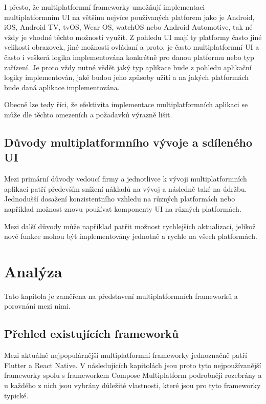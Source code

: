 I přesto, že multiplatformní frameworky umožňují implementaci multiplatformním UI na většinu nejvíce používaných platforem jako je Android, iOS,
Android TV, tvOS, Wear OS, watchOS nebo Android Automotive, tak né vždy je vhodné těchto možností využít. Z pohledu UI mají ty platformy často jiné 
velikosti obrazovek, jiné možnosti ovládaní a proto, je často multiplatformní UI a často i veškerá logika implementována konkrétně pro danou platformu
nebo typ zařízení. Je proto vždy nutné vědět jaký typ aplikace bude z pohledu aplikační logiky implementován, jaké budou jeho způsoby užití a na jakých 
platformách bude daná aplikace implementována.

Obecně lze tedy říci, že efektivita implementace multiplatformních aplikaci se může dle těchto omezeních a požadavků výrazně lišit.


\section{Důvody multiplatformního vývoje a sdíleného UI}

Mezi primární důvody vedoucí firmy a jednotlivce k vývoji multiplatformních aplikací patří především
snížení nákladů na vývoj a následně také na údržbu. Jednodušší dosažení konzistentního vzhledu
na různých platformách nebo například možnost znovu používat komponenty UI na různých platformách.

Mezi další důvody může například patřit možnost rychlejších aktualizací, jelikož nové funkce mohou být 
implementovány jednotně a rychle na všech platformách. 

\chapter{Analýza}
Tato kapitola je zaměřena na představení multiplatformních frameworků a porovnání mezi nimi. 

\section{Přehled existujících frameworků}
Mezi aktuálně nejpopulárnější multiplatformní frameworky jednoznačně patří Flutter a React Native. \cite{crossPlatformFrameworksStats}
V následujících kapitolách jsou proto tyto nejpoužívanější frameworky spolu s frameworkem Compose  Multiplatform podrobněji rozebrány a u každého z nich 
jsou vybrány důležité vlastnosti, které jsou pro tyto frameworky typické. 


